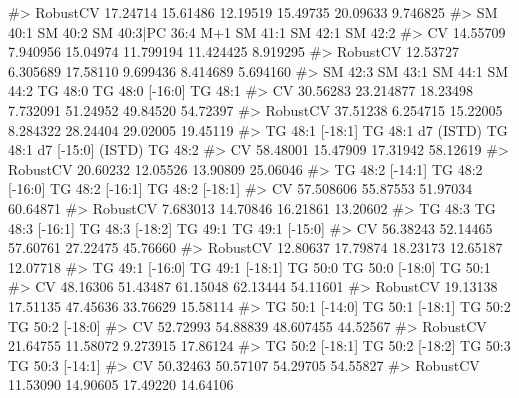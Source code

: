 \documentclass[
  letterpaper,
  DIV=11,
  numbers=noendperiod]{scrreprt}
\newenvironment{Shaded}{\begin{snugshade}}{\end{snugshade}}
\newcommand{\CommentTok}[1]{\textcolor[rgb]{0.37,0.37,0.37}{#1}}
\begin{document}
\begin{Shaded}
\begin{Highlighting}[]
\CommentTok{\#\textgreater{} RobustCV          17.24714 15.61486 12.19519 15.49735 20.09633  9.746825}
\CommentTok{\#\textgreater{}           SM 40:1  SM 40:2 SM 40:3|PC 36:4 M+1   SM 41:1   SM 42:1  SM 42:2}
\CommentTok{\#\textgreater{} CV       14.55709 7.940956            15.04974 11.799194 11.424425 8.919295}
\CommentTok{\#\textgreater{} RobustCV 12.53727 6.305689            17.58110  9.699436  8.414689 5.694160}
\CommentTok{\#\textgreater{}           SM 42:3   SM 43:1  SM 44:1  SM 44:2  TG 48:0 TG 48:0 [{-}16:0]  TG 48:1}
\CommentTok{\#\textgreater{} CV       30.56283 23.214877 18.23498 7.732091 51.24952        49.84520 54.72397}
\CommentTok{\#\textgreater{} RobustCV 37.51238  6.254715 15.22005 8.284322 28.24404        29.02005 19.45119}
\CommentTok{\#\textgreater{}          TG 48:1 [{-}18:1] TG 48:1 d7 (ISTD) TG 48:1 d7 [{-}15:0] (ISTD)  TG 48:2}
\CommentTok{\#\textgreater{} CV              58.48001          15.47909                  17.31942 58.12619}
\CommentTok{\#\textgreater{} RobustCV        20.60232          12.05526                  13.90809 25.06046}
\CommentTok{\#\textgreater{}          TG 48:2 [{-}14:1] TG 48:2 [{-}16:0] TG 48:2 [{-}16:1] TG 48:2 [{-}18:1]}
\CommentTok{\#\textgreater{} CV             57.508606        55.87553        51.97034        60.64871}
\CommentTok{\#\textgreater{} RobustCV        7.683013        14.70846        16.21861        13.20602}
\CommentTok{\#\textgreater{}           TG 48:3 TG 48:3 [{-}16:1] TG 48:3 [{-}18:2]  TG 49:1 TG 49:1 [{-}15:0]}
\CommentTok{\#\textgreater{} CV       56.38243        52.14465        57.60761 27.22475        45.76660}
\CommentTok{\#\textgreater{} RobustCV 12.80637        17.79874        18.23173 12.65187        12.07718}
\CommentTok{\#\textgreater{}          TG 49:1 [{-}16:0] TG 49:1 [{-}18:1]  TG 50:0 TG 50:0 [{-}18:0]  TG 50:1}
\CommentTok{\#\textgreater{} CV              48.16306        51.43487 61.15048        62.13444 54.11601}
\CommentTok{\#\textgreater{} RobustCV        19.13138        17.51135 47.45636        33.76629 15.58114}
\CommentTok{\#\textgreater{}          TG 50:1 [{-}14:0] TG 50:1 [{-}18:1]   TG 50:2 TG 50:2 [{-}18:0]}
\CommentTok{\#\textgreater{} CV              52.72993        54.88839 48.607455        44.52567}
\CommentTok{\#\textgreater{} RobustCV        21.64755        11.58072  9.273915        17.86124}
\CommentTok{\#\textgreater{}          TG 50:2 [{-}18:1] TG 50:2 [{-}18:2]  TG 50:3 TG 50:3 [{-}14:1]}
\CommentTok{\#\textgreater{} CV              50.32463        50.57107 54.29705        54.55827}
\CommentTok{\#\textgreater{} RobustCV        11.53090        14.90605 17.49220        14.64106}

\end{Highlighting}
\end{Shaded}
\end{document}
